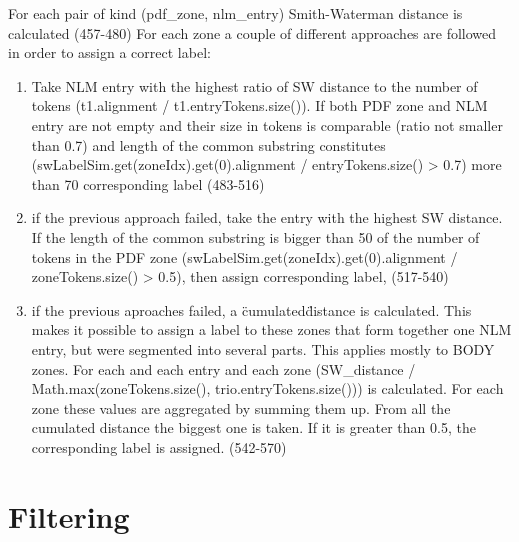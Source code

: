 For each pair of kind (pdf\_zone, nlm\_entry) Smith-Waterman distance
is calculated (457-480)
For each zone a couple of different approaches are followed in order
to assign a correct label:
\begin{enumerate}
\item Take NLM entry with the highest ratio of SW distance to the
number of tokens (t1.alignment / t1.entryTokens.size()). If both PDF
zone and NLM entry are not empty and their size in tokens is
comparable (ratio not smaller than 0.7) and length of the common
substring constitutes (swLabelSim.get(zoneIdx).get(0).alignment /
entryTokens.size() > 0.7) more than 70%
corresponding label  (483-516)
\item if the previous approach failed, take the entry with the highest
SW distance. If the length of the common substring is bigger than 50%
of the number of tokens in the PDF zone
(swLabelSim.get(zoneIdx).get(0).alignment / zoneTokens.size() > 0.5),
then assign corresponding label, (517-540)
\item if the previous aproaches failed, a \"cumulated\" distance is
calculated. This makes it possible to assign a label to these zones
that form together one NLM entry, but were segmented into several
parts. This applies mostly to BODY zones. For each and each entry and
each zone (SW\_distance / Math.max(zoneTokens.size(),
trio.entryTokens.size())) is calculated. For each zone these values
are aggregated by summing them up. From all the cumulated distance the
biggest one is taken. If it is greater than 0.5, the corresponding
label is assigned. (542-570)
\end{enumerate}
\section{Filtering}